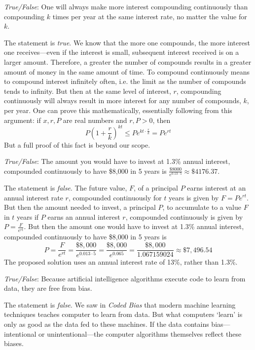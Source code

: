 \documentclass[11pt,letterpaper]{article}
\begin{document}
\quizsol \textit{True/False}: One will always make more interest compounding continuously than compounding $k$ times per year at the same interest rate, no matter the value for $k$. \pspace

\sol The statement is \textit{true}. We know that the more one compounds, the more interest one receives---even if the interest is small, subsequent interest received is on a larger amount. Therefore, a greater the number of compounds results in a greater amount of money in the same amount of time. To compound continuously means to compound interest infinitely often, i.e. the limit as the number of compounds tends to infinity. But then at the same level of interest, $r$, compounding continuously will always result in more interest for any number of compounds, $k$, per year. One can prove this mathematically, essentially following from this argument: if $x, r, P$ are real numbers and $r, P > 0$, then 
	\[
	P \left(1 + \dfrac{r}{k} \right)^{kt} \leq Pe^{kt \cdot \frac{r}{k}}= Pe^{rt}
	\]
But a full proof of this fact is beyond our scope. \pvspace{1.3cm}



\newpage



\quizsol \textit{True/False}: The amount you would have to invest at 1.3\% annual interest, compounded continuously to have \$8,000 in 5 years is $\frac{\$8000}{e^{0.13 \cdot 5}} \approx \$4176.37$. \pspace

\sol The statement is \textit{false}. The future value, $F$, of a principal $P$ earns interest at an annual interest rate $r$, compounded continuously for $t$ years is given by $F= Pe^{rt}$. But then the amount needed to invest, a principal $P$, to accumulate to a value $F$ in $t$ years if $P$ earns an annual interest $r$, compounded continuously is given by $P= \frac{F}{e^{rt}}$. But then the amount one would have to invest at 1.3\% annual interest, compounded continuously to have \$8,000 in 5 years is 
	\[
	P= \dfrac{F}{e^{rt}}= \dfrac{\$8,\!000}{e^{0.013 \cdot 5}}= \dfrac{\$8,\!000}{e^{0.065}}= \dfrac{\$8,\!000}{1.067159024} \approx \$7,\!496.54
	\]
The proposed solution uses an annual interest rate of 13\%, rather than 1.3\%. \pvspace{1.3cm}



\quizsol \textit{True/False}: Because artificial intelligence algorithms execute code to learn from data, they are free from bias. \pspace

\sol The statement is \textit{false}. We saw in \textit{Coded Bias} that modern machine learning techniques teaches computer to learn from data. But what computers `learn' is only as good as the data fed to these machines. If the data contains bias---intentional or unintentional---the computer algorithms themselves reflect these biases. \pvspace{1.3cm}
\end{document}

